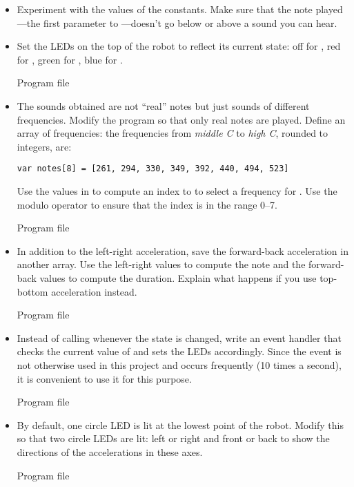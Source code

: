 \begin{itemize}
\item Experiment with the values of the constants. Make sure that
the note played---the first parameter
to ---doesn't go below or above a sound you can hear.

\item Set the LEDs on the top of the robot to reflect its current state:
off for , red for , green for , blue for .

{\raggedleft \hfill Program file }


\item The sounds obtained are not ``real'' notes but just sounds of
different frequencies. Modify the program so that only real notes are played.
Define an array of frequencies: the frequencies
from \emph{middle C} to \emph{high C}, rounded to integers, are:
\begin{verbatim}
var notes[8] = [261, 294, 330, 349, 392, 440, 494, 523]
\end{verbatim}
Use the values in  to compute an index to  to select
a frequency for .
Use the modulo operator  to ensure that the index is in
the range 0--7.

{\raggedleft \hfill Program file }

\item In addition to the left-right acceleration,
save the forward-back acceleration in another array. Use the left-right values
to compute the note and the forward-back values to compute the duration.
Explain what happens if you use top-bottom acceleration instead.

{\raggedleft \hfill Program file }

\item Instead of calling  whenever the state is changed, write an event handler that checks the current value of  and sets the LEDs accordingly. Since the  event is not otherwise used in this project
and occurs frequently (10 times a second), it is convenient to use it for this purpose.

{\raggedleft \hfill Program file }

\item By default, one circle LED is lit at the lowest point of the robot.
Modify this so that two circle LEDs are lit: left or right and front or back to show the directions of the accelerations in these axes.

{\raggedleft \hfill Program file }

\end{itemize}